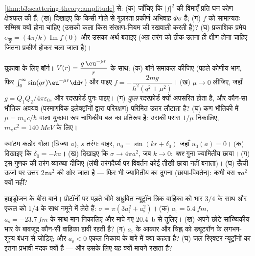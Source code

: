\begin{exercise}[$\star$]\label{exo:b3:scattering-theory:4}
\cref{thm:b3:scattering-theory:amplitude} से: (क) जाँचिए कि
$|f|^2$ की विमाएँ प्रति घन कोण क्षेत्रफल की हैं; (ख) दिखाइए कि
किसी गोले से गुज़रता प्रकीर्ण अभिवाह $\Phi\sigma$ है; (ग)
$f$ को सामान्यतः सम्मिश्र क्यों होना चाहिए (उसकी कला किस
संरक्षण-नियम की रखवाली करती है)? (घ) प्रकाशिक प्रमेय $\sigma_{\text{कु}} =
(4\pi/k)\operatorname{Im}f(0)$ और उसका अर्थ बताइए (अग्र तरंग को ठीक
उतना ही क्षीण होना चाहिए जितना प्रकीर्ण होकर चला जाता है)।
\end{exercise}

\begin{exercise}[$\star\star$]\label{exo:b3:scattering-theory:5}
युकावा के लिए बॉर्न। $V(r) = \dfrac{g\,\eu^{-\mu r}}{r}$ के साथ: (क)
बॉर्न समाकल कीजिए (पहले कोणीय भाग, फिर $\int_0^
\infty\sin(qr)\eu^{-\mu r}\dd r$) और पाइए $f = -\dfrac{2mg}
{\hbar^2(q^2 + \mu^2)}$। (ख) $\mu \to 0$ लीजिए, जहाँ $g =
Q_1Q_2/4\pi\varepsilon_0$, और रदरफ़ोर्ड पुनः पाइए। (ग) \emph{कुल}
रदरफ़ोर्ड  क्यों अपसरित होता है, और कौन-सा भौतिक
अवयव (परमाणविक इलेक्ट्रॉनों द्वारा परिरक्षण) परिमित
उत्तर लौटाता है? (घ) कण भौतिकी में $\mu =
m_\pi c/\hbar$ वाला युकावा रूप नाभिकीय बल का प्रतिरूप है: उसकी परास
$1/\mu$ निकालिए, $m_\pi c^2 = \qty{140}{MeV}$ के लिए।
\end{exercise}

\begin{exercise}[$\star\star$]\label{exo:b3:scattering-theory:6}
क्वांटम कठोर गोला (त्रिज्या $a$), $s$ तरंग: बाहर, $u_0 =
\sin(kr + \delta_0)$ जहाँ $u_0(a) = 0$। (क) दिखाइए कि $\delta_0 = -ka$।
(ख) दिखाइए कि $\sigma \to 4\pi a^2$, जब $k \to 0$: \emph{चार} गुना
ज्यामितीय छाया। (ग) इस गुणक की तरंग-व्याख्या दीजिए
(लंबी तरंगदैर्घ्य पर विवर्तन कोई तीखी छाया नहीं बनाता)। (घ) ऊँची
ऊर्जा पर उत्तर $2\pi a^2$ की ओर जाता है --- फिर भी ज्यामितीय का दुगना
(छाया-विवर्तन): कभी बस $\pi a^2$ क्यों नहीं?
\end{exercise}

\begin{exercise}[$\star\star$]\label{exo:b3:scattering-theory:7}
हाइड्रोजन के बीस बार्न। प्रोटॉनों पर पड़ते धीमे अध्रुवित न्यूट्रॉन
त्रिक वाहिका को भार $3/4$ के साथ और
एकल को $1/4$ के साथ नमूने में लेते हैं: $\sigma = \pi(3a_{\text{t}}^2 +
a_{\text{s}}^2)$। (क) $a_{\text{t}} = \qty{5.4}{fm}$,
$a_{\text{s}} = \qty{-23.7}{fm}$ के साथ मान निकालिए और मापे गए
\qty{20.4}{b} से तुलिए। (ख) अपने छोटे सांख्यिकीय भार के बावजूद
कौन-सी वाहिका हावी रहती है? (ग) $a_{\text{t}}$ के आकार और चिह्न को
ड्यूटरॉन के लगभग-शून्य बंधन से जोड़िए; और $a_{\text{s}} < 0$ एकल
निकाय के बारे में क्या कहता है? (घ) जल रिएक्टर न्यूट्रॉनों का इतना
प्रभावी मंदक क्यों है --- और उसके लिए यह  क्यों मायने
रखता है?
\end{exercise}

